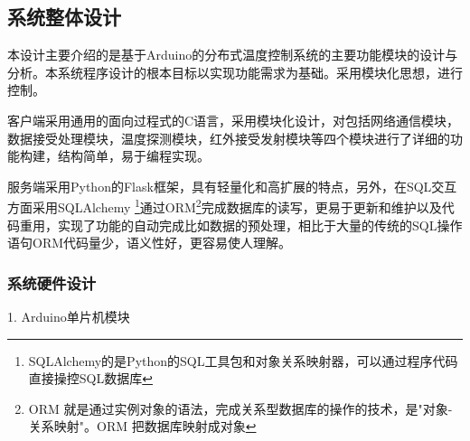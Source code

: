 \subsection{系统整体设计}

本设计主要介绍的是基于Arduino的分布式温度控制系统的主要功能模块的设计与分析。本系统程序设计的根本目标以实现功能需求为基础。采用模块化思想，进行控制。

客户端采用通用的面向过程式的C语言，采用模块化设计，对包括网络通信模块，数据接受处理模块，温度探测模块，红外接受发射模块等四个模块进行了详细的功能构建，结构简单，易于编程实现。

服务端采用Python的Flask框架，具有轻量化和高扩展的特点，另外，在SQL交互方面采用SQLAlchemy \footnote{SQLAlchemy的是Python的SQL工具包和对象关系映射器，可以通过程序代码直接操控SQL数据库}通过ORM\footnote{ORM 就是通过实例对象的语法，完成关系型数据库的操作的技术，是"对象-关系映射"。ORM 把数据库映射成对象}完成数据库的读写，更易于更新和维护以及代码重用，实现了功能的自动完成比如数据的预处理，相比于大量的传统的SQL操作语句ORM代码量少，语义性好，更容易使人理解。


\subsubsection{系统硬件设计}

1. Arduino单片机模块

